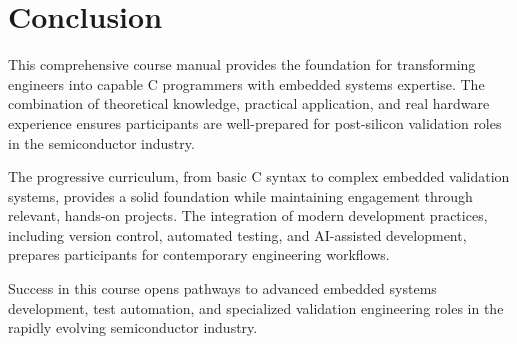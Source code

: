 \documentclass[11pt,a4paper]{article}
\begin{document}
\section{Conclusion}

This comprehensive course manual provides the foundation for transforming engineers into capable C programmers with embedded systems expertise. The combination of theoretical knowledge, practical application, and real hardware experience ensures participants are well-prepared for post-silicon validation roles in the semiconductor industry.

The progressive curriculum, from basic C syntax to complex embedded validation systems, provides a solid foundation while maintaining engagement through relevant, hands-on projects. The integration of modern development practices, including version control, automated testing, and AI-assisted development, prepares participants for contemporary engineering workflows.

Success in this course opens pathways to advanced embedded systems development, test automation, and specialized validation engineering roles in the rapidly evolving semiconductor industry.
\end{document}
